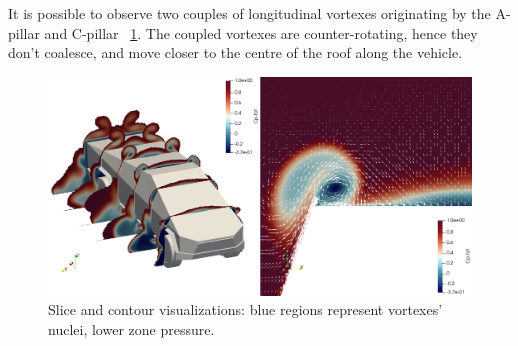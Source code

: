 \documentclass{elbioimp2}
\begin{document}
It is possible to observe two couples of longitudinal vortexes originating by the A-pillar and C-pillar ~\ref{vortexes}. The coupled vortexes are counter-rotating, hence they don't coalesce, and move closer to the centre of the roof along the vehicle. 
\begin{figure}[htp]
  \centering
  \includegraphics[width=0.9\columnwidth]{vortexes.png}
  \caption{Slice and contour visualizations: blue regions represent vortexes' nuclei, lower zone pressure.\label{vortexes}}
\end{figure}
\end{document}
